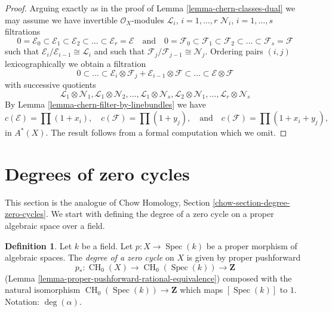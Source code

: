 \documentclass{stacks-project}
\theoremstyle{plain}
\theoremstyle{definition}
\newtheorem{definition}[subsection]{Definition}
\theoremstyle{remark}
\numberwithin{equation}{subsection}
\def\Spec{\mathop{\mathrm{Spec}}}
\def\CH{\mathop{\mathrm{CH}}\nolimits}
\begin{document}
\begin{proof}
Arguing exactly as in the proof of Lemma \ref{lemma-chern-classes-dual}
we may assume we have
invertible $\mathcal{O}_X$-modules
${\mathcal L}_i$, $i = 1, \ldots, r$
${\mathcal N}_i$, $i = 1, \ldots, s$
filtrations
$$
0 = \mathcal{E}_0 \subset \mathcal{E}_1 \subset \mathcal{E}_2
\subset \ldots \subset \mathcal{E}_r = \mathcal{E}
\quad\text{and}\quad
0 = \mathcal{F}_0 \subset \mathcal{F}_1 \subset \mathcal{F}_2
\subset \ldots \subset \mathcal{F}_s = \mathcal{F}
$$
such that $\mathcal{E}_i/\mathcal{E}_{i - 1} \cong \mathcal{L}_i$
and such that $\mathcal{F}_j/\mathcal{F}_{j - 1} \cong \mathcal{N}_j$.
Ordering pairs $(i, j)$ lexicographically
we obtain a filtration
$$
0 \subset \ldots \subset
\mathcal{E}_i \otimes \mathcal{F}_j
+
\mathcal{E}_{i - 1} \otimes \mathcal{F}
\subset \ldots \subset \mathcal{E} \otimes \mathcal{F}
$$
with successive quotients
$$
\mathcal{L}_1 \otimes \mathcal{N}_1,
\mathcal{L}_1 \otimes \mathcal{N}_2,
\ldots,
\mathcal{L}_1 \otimes \mathcal{N}_s,
\mathcal{L}_2 \otimes \mathcal{N}_1,
\ldots,
\mathcal{L}_r \otimes \mathcal{N}_s
$$
By Lemma \ref{lemma-chern-filter-by-linebundles}
we have
$$
c(\mathcal{E}) = \prod (1 + x_i),
\quad
c(\mathcal{F}) = \prod (1 + y_j),
\quad\text{and}\quad
c(\mathcal{F}) = \prod (1 + x_i + y_j),
$$
in $A^*(X)$. The result follows from a formal computation
which we omit.
\end{proof}











\section{Degrees of zero cycles}
\label{section-degree-zero-cycles}

\noindent
This section is the analogue of Chow Homology, Section
\ref{chow-section-degree-zero-cycles}.
We start with defining the degree of a zero cycle on a proper
algebraic space over a field.

\begin{definition}
\label{definition-degree-zero-cycle}
Let $k$ be a field. Let $p : X \to \Spec(k)$ be a proper morphism of
algebraic spaces. The {\it degree of a zero cycle} on $X$ is given by
proper pushforward
$$
p_* : \CH_0(X) \longrightarrow \CH_0(\Spec(k)) \longrightarrow \mathbf{Z}
$$
(Lemma \ref{lemma-proper-pushforward-rational-equivalence})
composed with the natural isomorphism $\CH_0(\Spec(k)) \to \mathbf{Z}$
which maps $[\Spec(k)]$ to $1$. Notation: $\deg(\alpha)$.
\end{definition}
\end{document}

